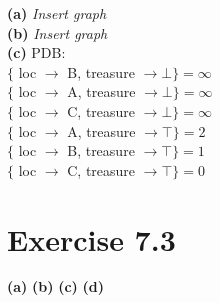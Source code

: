 \documentclass[12pt]{article}
\begin{document}
\textbf{(a)} \emph{Insert graph}\\
\textbf{(b)} \emph{Insert graph}\\
\textbf{(c)} PDB:\\
$\{$ loc $\to$ B, treasure $\to \bot \} = \infty$\\
$\{$ loc $\to$ A, treasure $\to \bot \} = \infty$\\
$\{$ loc $\to$ C, treasure $\to \bot \} = \infty$\\
$\{$ loc $\to$ A, treasure $\to \top \} = 2$\\
$\{$ loc $\to$ B, treasure $\to \top \} = 1$\\
$\{$ loc $\to$ C, treasure $\to \top \} = 0$\\

\section*{Exercise 7.3}

\textbf{(a)}
\textbf{(b)} 
\textbf{(c)} 
\textbf{(d)}
\end{document}

